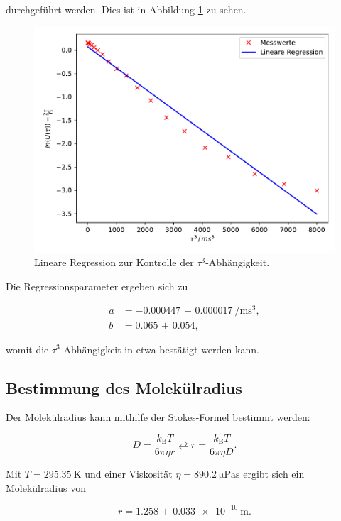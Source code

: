 durchgeführt werden. Dies ist in Abbildung \ref{fig:plot5} zu sehen. 

\begin{figure}
  \centering
  \includegraphics[scale=0.7]{content/plot5.pdf}
  \caption{Lineare Regression zur Kontrolle der $\tau^3$-Abhängigkeit.}
  \label{fig:plot5}
\end{figure}

Die Regressionsparameter ergeben sich zu 

\begin{align*}
  a &= \SI{-0.000447(17)}{\per\milli\second^3},\\
  b &= \num{0.065(54)},
\end{align*}

womit die $\tau^3$-Abhängigkeit in etwa bestätigt werden kann.

\subsection{Bestimmung des Molekülradius}

Der Molekülradius kann mithilfe der Stokes-Formel bestimmt werden:

\begin{equation*}
  D = \frac{k_\text{B}T}{6\pi\eta r} \rightleftarrows r = \frac{k_\text{B}T}{6 \pi\eta D}.
\end{equation*}

Mit $T = \SI{295.35}{\kelvin}$ und einer Viskosität $\eta = \SI{890.2}{\micro\pascal\second}$\cite{vis} ergibt sich ein Molekülradius
von

\begin{equation}
  r = \SI{1.258(33)e-10}{\metre}.
\end{equation}

